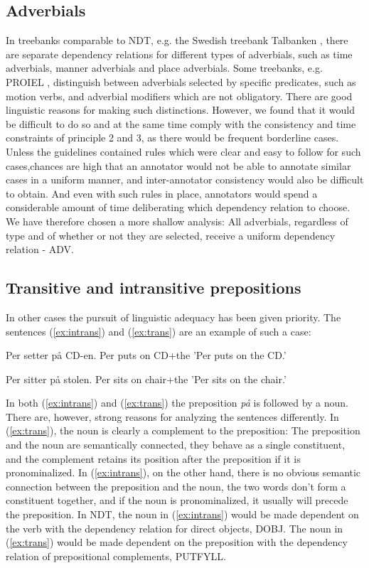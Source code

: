 \documentclass[11pt,a4paper]{article}
\begin{document}
\subsection{Adverbials}
In treebanks comparable to NDT, e.g. the Swedish treebank Talbanken \cite{Niv:Nil:Hal:2006}, there are separate dependency relations for different types of adverbials, such as time adverbials, manner adverbials and place adverbials. Some treebanks, e.g. PROIEL \cite{Hau:Joh:Eck:Wel:Her:Mut:2009}, distinguish between adverbials selected by specific predicates, such as motion verbs, and adverbial modifiers which are not obligatory. There are good linguistic reasons for making such distinctions. However, we found that it would be difficult to do so and at the same time comply with the consistency and time constraints of principle 2 and 3, as there would be frequent borderline cases. Unless the guidelines contained rules which were clear and easy to follow for such cases,chances are high that an annotator would not be able to annotate similar cases in a uniform manner, and inter-annotator consistency would also be difficult to obtain. And even with such rules in place, annotators would spend a considerable amount of time deliberating which dependency relation to choose. We have therefore chosen a more shallow analysis: All adverbials, regardless of type and of whether or not they are selected, receive a uniform dependency relation - ADV.

\subsection{Transitive and intransitive prepositions}
In other cases the pursuit of linguistic adequacy has been given priority. The sentences (\ref{ex:intrans}) and (\ref{ex:trans}) are an example of such a case:

\begin{examples}
\item\label{ex:intrans}
\gll Per setter på CD-en.
Per puts on CD+the
\glt 'Per puts on the CD.'
\glend

\item\label{ex:trans}
\gll Per sitter på stolen.
Per sits on chair+the
\glt 'Per sits on the chair.'
\glend
\end{examples}

In both (\ref{ex:intrans}) and (\ref{ex:trans}) the preposition \emph{på} is followed by a noun. There are, however, strong reasons for analyzing the sentences differently. In (\ref{ex:trans}), the noun is clearly a complement to the preposition: The preposition and the noun are semantically connected, they behave as a single constituent, and the complement retains its position after the preposition if it is pronominalized. In (\ref{ex:intrans}), on the other hand, there is no obvious semantic connection between the preposition and the noun, the two words don't form a constituent together, and if the noun is pronominalized, it usually will precede the preposition. In NDT, the noun in (\ref{ex:intrans}) would be made dependent on the verb with the dependency relation for direct objects, DOBJ. The noun in (\ref{ex:trans}) would be made dependent on the preposition with the dependency relation of prepositional complements, PUTFYLL.
\end{document}
